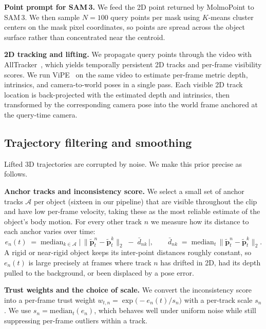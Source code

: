 \noindent\textbf{Point prompt for SAM\,3.}
We feed the 2D point returned by MolmoPoint to SAM\,3. We then sample $N=100$ query points per mask using $K$-means cluster centers on the mask pixel coordinates, so points are spread across the object surface rather than concentrated near the centroid.

\noindent\textbf{2D tracking and lifting.}
We propagate query points through the video with AllTracker~\cite{alltracker}, which yields temporally persistent 2D tracks and per-frame visibility scores. We run ViPE~\cite{vipe} on the same video to estimate per-frame metric depth, intrinsics, and camera-to-world poses in a single pass. Each visible 2D track location is back-projected with the estimated depth and intrinsics, then transformed by the corresponding camera pose into the world frame anchored at the query-time camera.

\subsection{Trajectory filtering and smoothing}
\label{appsec:filtering}

Lifted 3D trajectories are corrupted by noise. We make this prior precise as follows.

\noindent\textbf{Anchor tracks and inconsistency score.}
We select a small set of anchor tracks $\mathcal{A}$ per object (sixteen in our pipeline) that are visible throughout the clip and have low per-frame velocity, taking these as the most reliable estimate of the object's body motion. For every other track $n$ we measure how its distance to each anchor varies over time:
\begin{equation}
e_n(t) \;=\; \mathrm{median}_{k \in \mathcal{A}}\;\bigl|\, \|\tilde{\mathbf{p}}_t^{n} - \tilde{\mathbf{p}}_t^{k}\|_2 \;-\; \bar d_{nk} \,\bigr|,
\qquad
\bar d_{nk} \;=\; \mathrm{median}_t\, \|\tilde{\mathbf{p}}_t^{n} - \tilde{\mathbf{p}}_t^{k}\|_2 .
\end{equation}
A rigid or near-rigid object keeps its inter-point distances roughly constant, so $e_n(t)$ is large precisely at frames where track $n$ has drifted in 2D, had its depth pulled to the background, or been displaced by a pose error.

\noindent\textbf{Trust weights and the choice of scale.}
We convert the inconsistency score into a per-frame trust weight $w_{t,n} = \exp\bigl(-e_n(t)/s_n\bigr)$ with a per-track scale $s_n$. We use $s_n = \mathrm{median}_t(e_n)$, which behaves well under uniform noise while still suppressing per-frame outliers within a track.


